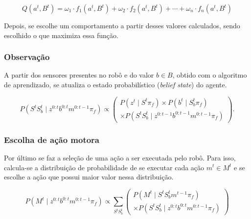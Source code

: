 \begin{equation} \label{equation:QLearningEscolhaComportamentoFinal}
    	Q \left( a^t, B^t \right) = \omega_1 \cdot f_1 \left( a^t, B^t \right) + \omega_2 \cdot f_2 \left( a^t, B^t \right) + \cdots + \omega_n \cdot f_n \left( a^t, B^t \right)
\end{equation}

Depois, se escolhe um comportamento a partir desses valores calculados, sendo escolhido o que maximiza essa função.


\subsubsection{Observação}

A partir dos sensores presentes no robô e do valor $ b \in B $, obtido com o algoritmo de aprendizado, se atualiza o estado probabilístico (\textit{belief state}) do agente.

\begin{equation}
    P \left( S^t S_b^t \mid z^{0: t} b^{0: t} m^{0: t-1} \pi_f \right) \propto
        \left(
            \begin{array}{l}
                P \left( z^t \mid S^t \pi_f \right) \times P \left( b^t \mid S_b^t \pi_f \right) \\
                \times P \left( S^t S_b^t \mid z^{0: t-1} b^{0: t-1} m^{0: t-1} \pi_f \right)
            \end{array}
        \right).
\end{equation}


\subsubsection{Escolha de ação motora}

Por último se faz a seleção de uma ação a ser executada pelo robô. Para isso, calcula-se a distribuição de probabilidade de se executar cada ação $ m^t \in M^t $ e se escolhe a ação que possui maior valor nessa distribuição.

\begin{equation}
    P \left( M^t \mid z^{0: t} b^{0: t} m^{0: t-1} \pi_f \right) \propto \sum\limits_{S^t S_b^t}
        \left(
            \begin{array}{l}
                P \left( M^t \mid S^t S_b^t m^{t-1} \pi_f \right)\\
                \times P \left( S^t S_b^t \mid z^{0: t} b^{0: t} m^{0: t-1} \pi_f \right)
            \end{array}
        \right)
\end{equation}


